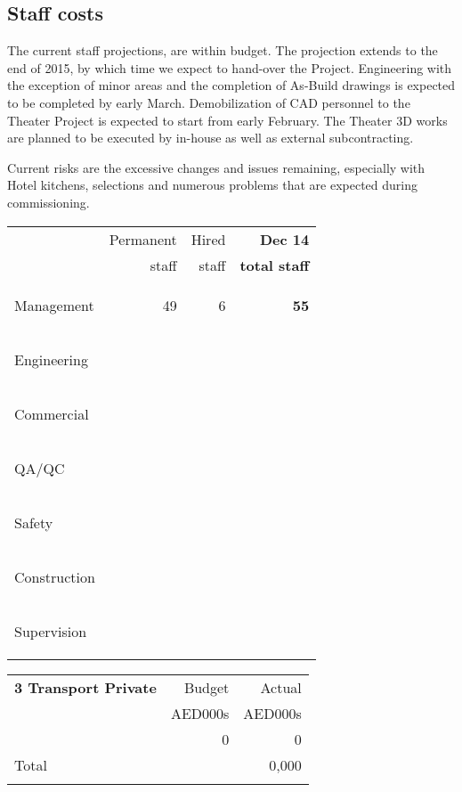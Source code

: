 \documentclass[oneside]{scrbook}
\makeatletter
\def\dotfill{%
\color{spot!50}%
\leavevmode
\cleaders \hb@xt@ 4pt{\hss \resizebox{1.5pt}{!}{\char"25CF}\relax\hss}\hfill
\kern\z@}%
\newcommand{\DotRow}[2]{%
\hbox to \columnwidth{\rule[-3pt]{0pt}{6pt}\dotfill}\break
}
\makeatother
\begin{document}
\begin{multicols}{2}
\subsection{Staff costs}

The current staff projections, are within budget. The projection extends to the end of 2015, by which time we expect to hand-over the Project. Engineering with the exception of minor areas and the completion of As-Build drawings is expected to be completed by early March. Demobilization of CAD personnel to the Theater Project is expected to start from early February. The Theater 3D works are planned to be executed by in-house as well as external subcontracting.

Current risks are the excessive changes and issues remaining, especially with Hotel kitchens, selections and numerous problems that are expected during commissioning.

\lorem\lorem

{\parindent0pt

\footnotesize
\begin{tabularx}{\columnwidth}{@{}>{\bfseries\raggedright}X r r   >{\bfseries} r@{}}
                 &Permanent    &Hired   &Dec 14  \\
                 &staff              &staff      &total staff \\
\noalign{\DotRow{}{}}
Management &49 &6 &55 \\
Engineering &&&\\
Commercial & & &\\
QA/QC        & &&\\
Safety          & & &\\
Construction & & &\\
Supervision  & & &\\
\end{tabularx}}
\end{multicols}

\bigskip
\parindent0pt
\begin{tabularx}{\linewidth}{Xrr}
\textbf{3 Transport Private}                                                 &Budget   &Actual\\
                                                                               &AED000s &AED000s\\
 \noalign{\DotRow{}{}}    
               &0 &0\\
               
\noalign{\DotRow{}{}}                                                                                  
Total												& &0,000 \\
\noalign{\DotRow{}{}}
 \end{tabularx}    
\vspace*{1.8cm}
\end{document}
